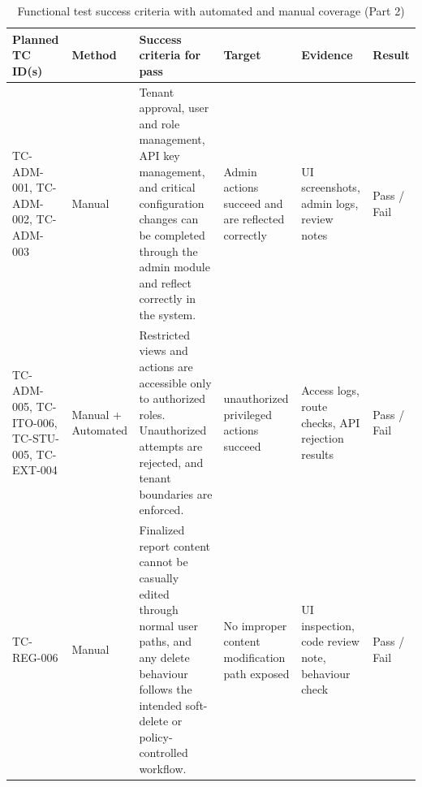 \begin{table}[H]
  \centering
  \smalltable
  \footnotesize
  {%
  \setlength{\tabcolsep}{4pt}%
  \renewcommand{\arraystretch}{1.35}%

  \begin{tabular}{|>{\raggedright\arraybackslash}p{}|
                  >{\raggedright\arraybackslash}p{}|
                  >{\raggedright\arraybackslash}p{}|
                  >{\raggedright\arraybackslash}p{}|
                  >{\raggedright\arraybackslash}p{}|
                  >{\raggedright\arraybackslash}p{}|}
    \hline
    \textbf{Planned TC ID(s)} &
    \textbf{Method} &
    \textbf{Success criteria for pass} &
    \textbf{Target} &
    \textbf{Evidence} &
    \textbf{Result} \\
    \hline\hline

    TC-ADM-001, TC-ADM-002, TC-ADM-003 &
    Manual &
    Tenant approval, user and role management, API key management, and
    critical configuration changes can be completed through the admin module
    and reflect correctly in the system. &
    Admin actions succeed and are reflected correctly &
    UI screenshots, admin logs, review notes &
    Pass / Fail \\
    \hline

    TC-ADM-005, TC-ITO-006, TC-STU-005, TC-EXT-004 &
    Manual + Automated &
    Restricted views and actions are accessible only to authorized roles.
    Unauthorized attempts are rejected, and tenant boundaries are enforced. &
    0 unauthorized privileged actions succeed &
    Access logs, route checks, API rejection results &
    Pass / Fail \\
    \hline

    TC-REG-006 &
    Manual &
    Finalized report content cannot be casually edited through normal user
    paths, and any delete behaviour follows the intended soft-delete or
    policy-controlled workflow. &
    No improper content modification path exposed &
    UI inspection, code review note, behaviour check &
    Pass / Fail \\
    \hline

  \end{tabular}
  }%
  \captionsetup{type=table}
  \caption{Functional test success criteria with automated and manual coverage (Part 2)}
  \label{tab:functional-success-criteria-b}
\end{table}

